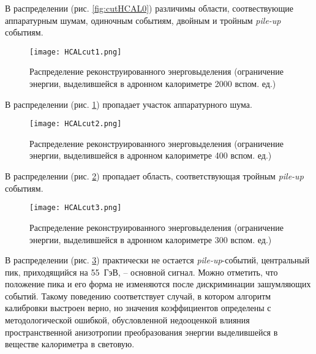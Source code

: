 В распределении (рис. \ref{fig:cutHCAL0}) различимы области, соотвествующие аппаратурным шумам, одиночным событиям, двойным и тройным \textit{pile-up} событиям.

\begin{figure}[H]
    \centering
    \texttt{[image: HCALcut1.png]}
    \caption{Распределение реконструированного энерговыделения (ограничение энергии, выделившейся в адронном калориметре 2000 вспом. ед.)}
    \label{fig:cutHCAL1}
\end{figure}

В распределении (рис. \ref{fig:cutHCAL1}) пропадает участок аппаратурного шума.

\begin{figure}[H]
    \centering
    \texttt{[image: HCALcut2.png]}
    \caption{Распределение реконструированного энерговыделения (ограничение энергии, выделившейся в адронном калориметре 400 вспом. ед.)}
    \label{fig:cutHCAL2}
\end{figure}

В распределении (рис. \ref{fig:cutHCAL2}) пропадает область, соответствующая тройным \textit{pile-up} событиям.

\begin{figure}[H]
    \centering
    \texttt{[image: HCALcut3.png]}
    \caption{Распределение реконструированного энерговыделения (ограничение энергии, выделившейся в адронном калориметре 300 вспом. ед.)}
    \label{fig:cutHCAL3}
\end{figure}

В распределении (рис. \ref{fig:cutHCAL3}) практически не остается \textit{pile-up}-событий, центральный пик, приходящийся на \mbox{55 ГэВ}, -- основной сигнал. Можно отметить, что положение пика и его форма не изменяются после дискриминации зашумляющих событий. Такому поведению соответствует случай, в котором алгоритм калибровки выстроен верно, но значения коэффициентов определены с методологической ошибкой, обусловленной недооценкой влияния пространственной анизотропии преобразования энергии выделившейся в веществе калориметра в световую.
